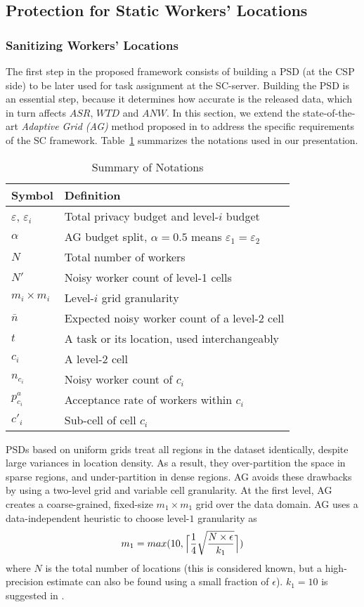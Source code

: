\documentclass{USC-Thesis}
\renewcommand\bf\bfseries  %
\newcommand{\tn}{\tabularnewline}
\DeclarePairedDelimiter{\ceil}{\lceil}{\rceil}
\numberwithin{equation}{chapter}
\begin{document}
\subsection{Protection for Static Workers' Locations}
\subsubsection{Sanitizing Workers' Locations}
\label{sec:psd}

The first step in the proposed framework consists of building a PSD (at the CSP side) to be later used for task assignment at the SC-server. Building the PSD is an essential step, because it determines how accurate is the released data, which in turn affects $\mathit{ASR}$, $\mathit{WTD}$ and $\mathit{ANW}$. 
In this section, we extend the state-of-the-art {\em Adaptive Grid (AG)} method proposed in \cite{qardaji2012differentially} to address the specific requirements of the SC framework.
Table~\ref{tab:notation1} summarizes the notations used in our presentation.

\begin{table}
\begin{center}
\footnotesize
\begin{tabular}{ l | l}
\hline
{\bf Symbol} & {\bf Definition} \tn
\hline
$\varepsilon$, $\varepsilon_i$ & Total privacy budget and level-$i$ budget \tn
\hline
$\alpha$ & AG budget split, $\alpha=0.5$ means $\varepsilon_1=\varepsilon_2$  \tn
\hline
$N$ & Total number of workers \tn
\hline
$N'$ & Noisy worker count of level-1 cells \tn
\hline
$m_i\times m_i$ & Level-$i$ grid granularity \tn
\hline
$\bar{n}$ & Expected noisy worker count of a level-2 cell \tn
\hline
$t$ & A task or its location, used interchangeably \tn
\hline
$c_i$ & A level-2 cell \tn
\hline
$n_{c_i}$ & Noisy worker count of $c_i$ \tn
\hline
$p^a_{c_i}$ & Acceptance rate of workers within $c_i$ \tn
\hline
$c'_i$ & Sub-cell of cell $c_i$ \tn
\hline
\end{tabular}
\caption{Summary of Notations}
\label{tab:notation1}
\end{center}
\end{table}

PSDs based on uniform grids treat all regions in the dataset identically, despite large variances in location density. As a result, they over-partition the space in sparse regions, and under-partition in dense regions. AG avoids these drawbacks by using a two-level grid and variable cell granularity. At the first level, AG creates a coarse-grained, fixed-size $m_1\times m_1$ grid over the data domain. AG uses a data-independent heuristic to choose level-$1$ granularity as
$$m_1=max(10,\ceil[\Big]{ \frac{1}{4}\sqrt{\frac{N \times \epsilon}{k_1}} })$$
where $N$ is the total number of locations (this is considered known, but a high-precision estimate can also be found using a small fraction of $\epsilon$). $k_1=10$ is suggested in \cite{qardaji2012differentially}.
\end{document}
